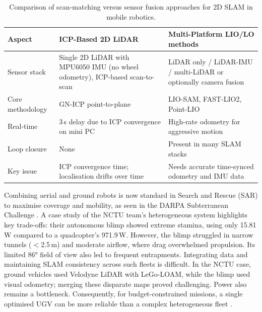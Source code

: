 \begin{table}[htbp]
\caption{Comparison of scan-matching versus sensor fusion approaches for 2D SLAM in mobile robotics.}
\label{tab:slam_compare}
\centering
\small
\begin{tabular}{p{2.8cm}p{3.2cm}p{3.8cm}}
\toprule
\textbf{Aspect} & \textbf{ICP-Based 2D LiDAR \cite{silva2025}} & \textbf{Multi-Platform LIO/LO methods \cite{lee2024}} \\
\midrule
Sensor stack & Single 2D LiDAR with MPU6050 IMU (no wheel odometry), ICP-based scan-to-scan & LiDAR only / LiDAR-IMU / multi-LiDAR or optionally camera fusion \\
Core methodology & GN-ICP point-to-plane & LIO-SAM, FAST-LIO2, Point-LIO \\
Real-time & 3\,s delay due to ICP convergence on mini PC & High-rate odometry for aggressive motion \\
Loop closure & None & Present in many SLAM stacks \\
Key issue & ICP convergence time; localisation drifts over time & Needs accurate time-synced odometry and IMU data \\
\bottomrule
\end{tabular}
\end{table}

Combining aerial and ground robots is now standard in Search and Rescue (SAR) to maximise coverage and mobility, as seen in the DARPA Subterranean Challenge \cite{lu2022}. A case study of the NCTU team's heterogeneous system highlights key trade-offs: their autonomous blimp showed extreme stamina, using only 15.81\,W compared to a quadcopter's 971.9\,W. However, the blimp struggled in narrow tunnels ($<$2.5\,m) and moderate airflow, where drag overwhelmed propulsion. Its limited 86° field of view also led to frequent entrapments. Integrating data and maintaining SLAM consistency across such fleets is difficult. In the NCTU case, ground vehicles used Velodyne LiDAR with LeGo-LOAM, while the blimp used visual odometry; merging these disparate maps proved challenging. Power also remains a bottleneck. Consequently, for budget-constrained missions, a single optimised UGV can be more reliable than a complex heterogeneous fleet \cite{lu2022}.

